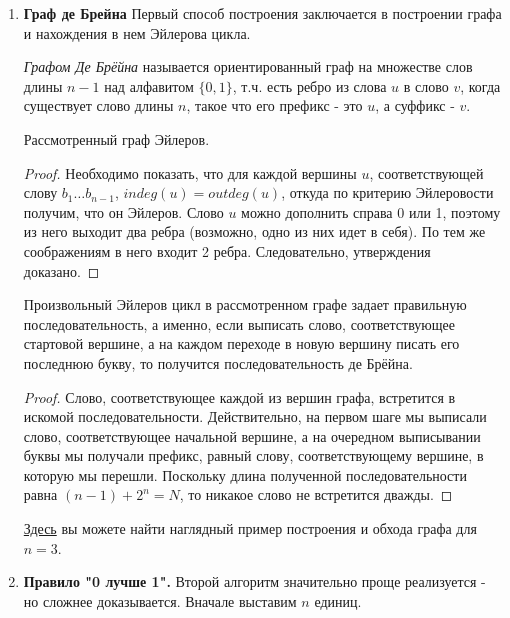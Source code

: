 \begin{enumerate} \renewcommand{\theenumi}{\bfseries \arabic{enumi}}
	\item {\bfseries Граф де Брейна} Первый способ построения заключается в построении графа и нахождения в нем Эйлерова цикла.
	\begin{Def}
		\emph{Графом Де Брёйна} называется ориентированный граф на множестве слов длины $ n-1 $ над алфавитом $ \{0, 1\} $, т.ч. есть ребро из слова $ u $ в слово $ v $, когда существует слово  длины $ n $, такое что его префикс - это $ u $, а суффикс - $ v $.
	\end{Def}

	\begin{prop}
		Рассмотренный граф Эйлеров.
	\end{prop}

	\begin{proof}
		Необходимо показать, что для каждой вершины $u$, соответствующей слову $ b_1\ldots b_{n-1} $, $ indeg(u) = outdeg(u) $, откуда по критерию Эйлеровости получим, что он Эйлеров. Слово $ u $ можно дополнить справа 0 или 1, поэтому из него выходит два ребра (возможно, одно из них идет в себя). По тем же соображениям в него входит 2 ребра. Следовательно, утверждения доказано.
	\end{proof}

	\begin{prop}
		Произвольный Эйлеров цикл в рассмотренном графе задает правильную последовательность, а именно, если выписать слово, соответствующее стартовой вершине, а на каждом переходе в новую вершину писать его последнюю букву, то получится последовательность де Брёйна.
	\end{prop}

	\begin{proof}
		Слово, соответствующее каждой из вершин графа, встретится в искомой последовательности. Действительно, на первом шаге мы выписали слово, соответствующее начальной вершине, а на очередном выписывании буквы мы получали префикс, равный слову, соответствующему вершине, в которую мы перешли. Поскольку длина полученной последовательности равна $ (n - 1) + 2^n = N$, то никакое слово не встретится дважды.
	\end{proof}

	\begin{note}
		\href{https://mipt.lectoriy.ru/file/synopsis/pdf/Maths-DiscreteMathem-M05-Raygor-131016.03.pdf}{Здесь} вы можете найти наглядный пример построения и обхода графа для $ n = 3 $.
	\end{note}

	\item {\bfseries Правило "0 лучше 1".} Второй алгоритм значительно проще реализуется - но сложнее доказывается.
	Вначале выставим $ n $ единиц.
\end{enumerate}
